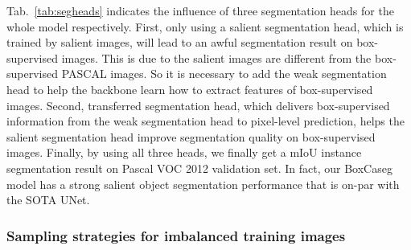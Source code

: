 \documentclass[final]{cvpr}
\begin{document}
Tab.~\ref{tab:segheads} indicates the influence of three segmentation heads for the whole model respectively. First, only using a salient segmentation head, which is trained by salient images, will lead to an awful segmentation result on box-supervised images. This is due to the salient images are different from the box-supervised PASCAL images. So it is necessary to add the weak segmentation head to help the backbone learn how to extract features of box-supervised images. Second, transferred segmentation head, which delivers box-supervised information from the weak segmentation head to pixel-level prediction, helps the salient segmentation head improve segmentation quality on box-supervised images. Finally, by using all three heads, we finally get a  mIoU instance segmentation result on Pascal VOC 2012 validation set. In fact, our BoxCaseg model has a strong salient object segmentation performance that is on-par with the SOTA UNet\cite{qin2020u2}.





\begin{table}[htbp]
    \caption{Results on PASCAL val when using different segmentation heads. Weak, Salient, and Trans denote the weak, salient, and transferred segmentation heads respectively. If only Trans or Salient is checked,  in Eq.~\eqref{eq:pix} is set to  or .}
    \centering
    \label{tab:segheads}
\end{table}

\vspace{-3mm}
\subsubsection{Sampling strategies for imbalanced training images}
\vspace{-1mm}
\end{document}
